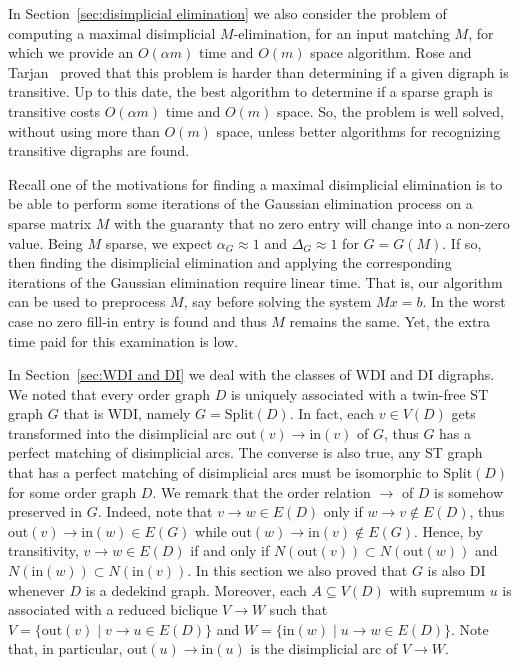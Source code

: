 \documentclass[a4paper,11pt]{article}
\newcommand{\SPLIT}{\ensuremath{\mathrm{Split}}}
\newcommand{\IN}{\ensuremath{\mathrm{in}}}
\newcommand{\OUT}{\ensuremath{\mathrm{out}}}
\begin{document}
In Section~\ref{sec:disimplicial elimination} we also consider the problem of computing a maximal disimplicial $M$-elimination, for an input matching $M$, for which we provide an $O(\alpha m)$ time and $O(m)$ space algorithm.  Rose and Tarjan~\cite{RoseTarjanSJAM1978} proved that this problem is harder than determining if a given digraph is transitive.  Up to this date, the best algorithm to determine if a sparse graph is transitive costs $O(\alpha m)$ time and $O(m)$ space.  So, the problem is well solved, without using more than $O(m)$ space, unless better algorithms for recognizing transitive digraphs are found.

Recall one of the motivations for finding a maximal disimplicial elimination is to be able to perform some iterations of the Gaussian elimination process on a sparse matrix $M$ with the guaranty that no zero entry will change into a non-zero value.  Being $M$ sparse, we expect $\alpha_G \approx 1$ and $\Delta_G \approx 1$ for $G = G(M)$.  If so, then finding the disimplicial elimination and applying the corresponding iterations of the Gaussian elimination require linear time.  That is, our algorithm can be used to preprocess $M$, say before solving the system $Mx = b$.  In the worst case no zero fill-in entry is found and thus $M$ remains the same.  Yet, the extra time paid for this examination is low.

In Section~\ref{sec:WDI and DI} we deal with the classes of WDI and DI digraphs.  We noted that every order graph $D$ is uniquely associated with a twin-free ST graph $G$ that is WDI, namely $G = \SPLIT(D)$.  In fact, each $v \in V(D)$ gets transformed into the disimplicial arc $\OUT(v) \to \IN(v)$ of $G$, thus $G$ has a perfect matching of disimplicial arcs.  The converse is also true, any ST graph that has a perfect matching of disimplicial arcs must be isomorphic to $\SPLIT(D)$ for some order graph $D$.  We remark that the order relation $\to$ of $D$ is somehow preserved in $G$.  Indeed, note that $v \to w \in E(D)$ only if $w \to v \not\in E(D)$, thus $\OUT(v) \to \IN(w) \in E(G)$ while $\OUT(w) \to \IN(v) \not\in E(G)$.  Hence, by transitivity, $v \to w \in E(D)$ if and only if $N(\OUT(v)) \subset N(\OUT(w))$ and $N(\IN(w)) \subset N(\IN(v))$.  In this section we also proved that $G$ is also DI whenever $D$ is a dedekind graph.  Moreover, each $A \subseteq V(D)$ with supremum $u$ is associated with a reduced biclique $V \to W$ such that $V = \{\OUT(v) \mid v \to u \in E(D)\}$ and $W = \{\IN(w) \mid u \to w \in E(D)\}$.   Note that, in particular, $\OUT(u) \to \IN(u)$ is the disimplicial arc of $V \to W$.  
\end{document}
